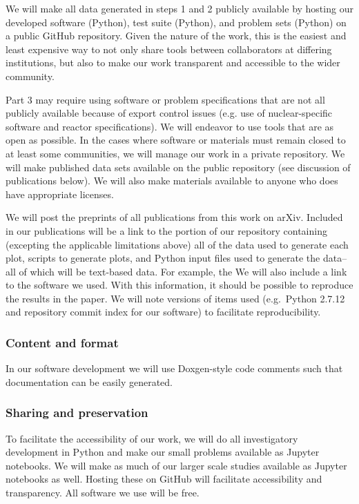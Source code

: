 \documentclass[12pt]{article}
\begin{document}
We will make all data generated in steps 1 and 2 publicly available by hosting our developed software (Python), test suite (Python), and problem sets (Python) on a public GitHub repository. Given the nature of the work, this is the easiest and least expensive way to not only share tools between collaborators at differing institutions, but also to make our work transparent and accessible to the wider community. 

Part 3 may require using software or problem specifications that are not all publicly available because of export control issues (e.g. use of nuclear-specific software and reactor specifications). We will endeavor to use tools that are as open as possible. In the cases where software or materials must remain closed to at least some communities, we will manage our work in a private repository. We will make published data sets available on the public repository (see discussion of publications below). We will also make materials available to anyone who does have appropriate licenses. 

We will post the preprints of all publications from this work on arXiv. Included in our publications will be a link to the portion of our repository containing (excepting the applicable limitations above) all of the data used to generate each plot, scripts to generate plots, and Python input files used to generate the data--all of which will be text-based data. For example, the We will also include a link to the software we used. With this information, it should be possible to reproduce the results in the paper. We will note versions of items used (e.g.\ Python 2.7.12 and repository commit index for our software) to facilitate reproducibility.\vspace{-15pt}

\subsubsection*{Content and format}\vspace{-15pt}
In our software development we will use Doxgen-style code comments such that documentation can be easily generated. 

\subsubsection*{Sharing and preservation}\vspace{-15pt}
To facilitate the accessibility of our work, we will do all investigatory development in Python and make our small problems available as Jupyter notebooks. We will make as much of our larger scale studies available as Jupyter notebooks as well. Hosting these on GitHub will facilitate accessibility and transparency. All software we use will be free.
 
\end{document}
